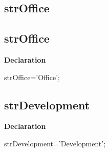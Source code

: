 \documentclass{report}
\newif\ifpdf
\begin{document}
\subsection*{\large{\textbf{strOffice}}\normalsize\hspace{1ex}\hrulefill}
\else
\subsection*{strOffice}
\fi
\label{trstrings-strOffice}
\begin{list}{}{
\setlength{\itemindent}{0cm}
\setlength{\listparindent}{0cm}
\setlength{\leftmargin}{\evensidemargin}
\addtolength{\leftmargin}{\tmplength}
\settowidth{\labelsep}{X}
\addtolength{\leftmargin}{\labelsep}
\setlength{\labelwidth}{\tmplength}
}
\item[\textbf{Declaration}\hfill]
\ifpdf
\begin{flushleft}
\fi
\begin{ttfamily}
strOffice='Office';\end{ttfamily}

\ifpdf
\end{flushleft}
\fi

\end{list}
\ifpdf
\subsection*{\large{\textbf{strDevelopment}}\normalsize\hspace{1ex}\hrulefill}
\else
\subsection*{strDevelopment}
\fi
\label{trstrings-strDevelopment}
\begin{list}{}{
\setlength{\itemindent}{0cm}
\setlength{\listparindent}{0cm}
\setlength{\leftmargin}{\evensidemargin}
\addtolength{\leftmargin}{\tmplength}
\settowidth{\labelsep}{X}
\addtolength{\leftmargin}{\labelsep}
\setlength{\labelwidth}{\tmplength}
}
\item[\textbf{Declaration}\hfill]
\ifpdf
\begin{flushleft}
\fi
\begin{ttfamily}
strDevelopment='Development';\end{ttfamily}

\ifpdf
\end{flushleft}
\fi

\end{list}
\ifpdf
\end{document}
